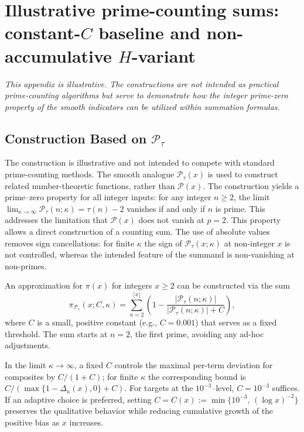 \appendix

\section{Illustrative prime-counting sums: constant-$C$ baseline and non-accumulative $H$-variant}

\noindent\textit{This appendix is illustrative. The constructions are not intended as practical prime-counting algorithms but serve to demonstrate how the integer prime-zero property of the smooth indicators can be utilized within summation formulas.}

\subsection{Construction Based on $\mathcal{P}_{\tau}$}
The construction is illustrative and not intended to compete with standard prime-counting methods.
The smooth analogue $\mathcal{P}_{\tau}(x)$ is used to construct related number-theoretic functions, rather than $\mathcal{P}(x)$.
The construction yields a prime–zero property for all integer inputs: for any integer $n \ge 2$, the limit $\lim_{\kappa\to\infty} \mathcal{P}_{\tau}(n;\kappa)=\tau(n)-2$ vanishes if and only if $n$ is prime.
This addresses the limitation that $\mathcal{P}(x)$ does not vanish at $p=2$.
This property allows a direct construction of a counting sum. The use of absolute values removes sign cancellations: for finite $\kappa$ the sign of $\mathcal{P}_{\tau}(x;\kappa)$ at non-integer $x$ is not controlled, whereas the intended feature of the summand is non-vanishing at non-primes.

\begin{definition}
An approximation for $\pi(x)$ for integers $x\ge2$ can be constructed via the sum
\begin{equation}\label{eq:pi_P_tau}
\pi_{\mathcal{P}_\tau}(x; C, \kappa) = \sum_{n=2}^{\lfloor x \rfloor} \left(1 - \frac{|\mathcal{P}_{\tau}(n; \kappa)|}{|\mathcal{P}_{\tau}(n; \kappa)| + C}\right),
\end{equation}
where $C$ is a small, positive constant (e.g., $C=0.001$) that serves as a fixed threshold.
The sum starts at $n=2$, the first prime, avoiding any ad-hoc adjustments.
\end{definition}

\begin{remark}
In the limit $\kappa\to\infty$, a fixed $C$ controls the maximal per-term deviation for composites by $C/(1+C)$; for finite $\kappa$ the corresponding bound is $C/(\max\{1-\Delta_\kappa(x),0\}+C)$. For targets at the $10^{-3}$–level, $C=10^{-3}$ suffices. If an adaptive choice is preferred, setting $C=C(x):=\min\{10^{-3},\,(\log x)^{-2}\}$ preserves the qualitative behavior while reducing cumulative growth of the positive bias as $x$ increases.
\end{remark}

